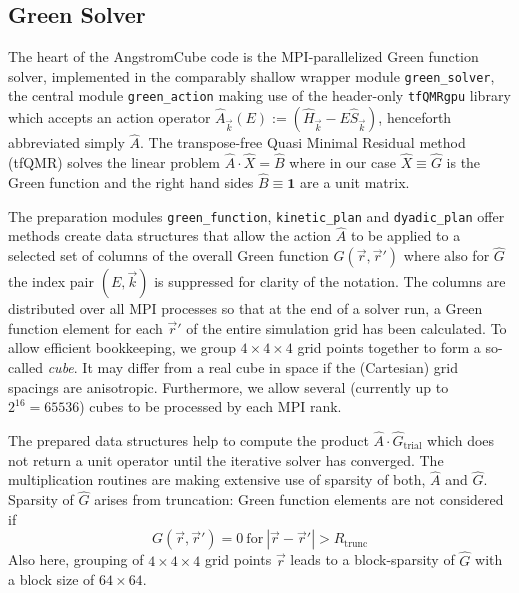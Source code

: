 \documentclass[oribibl]{llncs}
\newcommand{\um}[1]{_{\mathrm{#1}}}
\newcommand{\ttt}[1]{\texttt{#1}}
\newcommand{\fullcodename}{AngstromCube}
\begin{document}
\subsection{Green Solver}
The heart of the \fullcodename{} code is the \ac{MPI}-parallelized Green function solver,
implemented in the comparably shallow wrapper module \ttt{green\_solver}, 
the central module \ttt{green\_action} making use of the header-only \ttt{tfQMRgpu} library \cite{tfQMRgpu-preprint}
which accepts an action operator $\hat A_{\vec k}(E) := (\hat H_{\vec k} - E\hat S_{\vec k})$, henceforth abbreviated simply $\hat A$.
The transpose-free Quasi Minimal Residual method (tfQMR) solves the linear problem $\hat A \cdot \hat X = \hat B$ where in our case $\hat X \equiv \hat G$ is the Green function and the right hand sides $\hat B \equiv \mathbf{1}$ are a unit matrix.

\noindent
The preparation modules \ttt{green\_function}, \ttt{kinetic\_plan} and \ttt{dyadic\_plan} offer methods create data structures that allow the action $\hat A$ to be applied to a selected set of columns of the overall Green function $\hat G(\vec r, \vec r')$ where also for $\hat G$ the index pair $(E,\vec k)$ is suppressed for clarity of the notation.
The columns are distributed over all \ac{MPI} processes so that at the end of a solver run, a Green function element for each $\vec r'$ of the entire simulation grid has been calculated.
To allow efficient bookkeeping, we group $4 \times 4 \times 4$ grid points together to form a so-called \emph{cube}.
It may differ from a real cube in space if the (Cartesian) grid spacings are anisotropic.
Furthermore, we allow several (currently up to $2^{16}=65536$) cubes to be processed by each \ac{MPI} rank.

The prepared data structures help to compute the product $\hat A \cdot \hat G\um{trial}$ which does not return a unit operator until the iterative solver has converged. The multiplication routines are making extensive use of sparsity of both, $\hat A$ and $\hat G$. Sparsity of $\hat G$ arises from truncation: Green function elements are not considered if 
\begin{equation}
	G(\vec r,\vec r') = 0 \  \text{for} \  |\vec r - \vec r'| > R\um{trunc}
\end{equation}
Also here, grouping of $4 \times 4 \times 4$ grid points $\vec r$ leads to a block-sparsity of $\hat G$ with a block size of $64 \times 64$.
\end{document}
